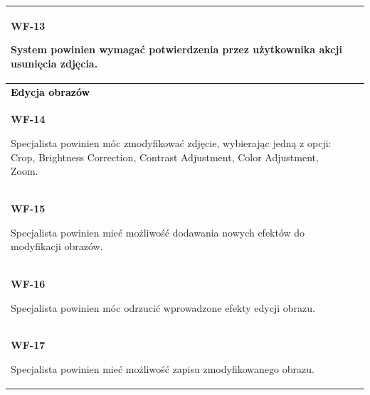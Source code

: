 \documentclass{scrreprt}
\begin{document}
\begin{center}
\begin{tabularx}{\textwidth}[t]{XX}
\textbf{\textcolor{myBlue}{WF-13}}
\hspace{0.8cm}
\begin{minipage}[t]{1.7\linewidth}%
System powinien wymagać potwierdzenia przez użytkownika akcji usunięcia zdjęcia.
\end{minipage}\\

\hline
\textbf{\textcolor{black}{Edycja obrazów}} \\
\hline

\textbf{\textcolor{myBlue}{WF-14}}
\hspace{0.8cm}
\begin{minipage}[t]{1.7\linewidth}%
Specjalista powinien móc zmodyfikować zdjęcie, wybierając jedną z opcji: Crop, Brightness Correction, Contrast Adjustment, Color Adjustment, Zoom.
\end{minipage}\\

\textbf{\textcolor{myBlue}{WF-15}}
\hspace{0.8cm}
\begin{minipage}[t]{1.7\linewidth}%
Specjalista powinien mieć możliwo\'sć dodawania nowych efektów do modyfikacji obrazów.
\end{minipage}\\

\textbf{\textcolor{myBlue}{WF-16}}
\hspace{0.8cm}
\begin{minipage}[t]{1.7\linewidth}%
Specjalista powinien móc odrzucić wprowadzone efekty edycji obrazu.
\end{minipage}\\


\textbf{\textcolor{myBlue}{WF-17}}
\hspace{0.8cm}
\begin{minipage}[t]{1.7\linewidth}%
Specjalista powinien mieć możliwo\'sć zapisu zmodyfikowanego obrazu.
\end{minipage}\\
\hline
\end{tabularx}
\end{center}


\end{document}
